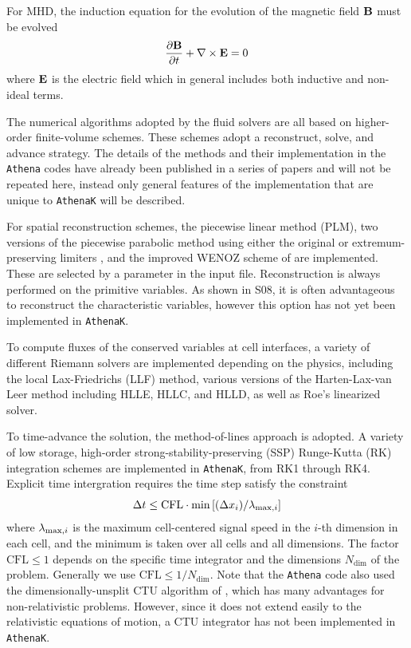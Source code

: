 \documentclass[twocolumn, floatfix]{aastex63}
\newcommand{\athena}{\texttt{Athena}}
\newcommand{\ak}{\texttt{AthenaK}}
\begin{document}
For MHD, the induction equation for the evolution of the magnetic field ${\bf B}$ must be evolved
\begin{equation}
\frac{\partial {\bf B}}{\partial t} + \nabla \times {\bf E} = 0
\label{eq:induction}
\end{equation}
where ${\bf E}$ is the electric field which in general includes both inductive and non-ideal terms.

The numerical algorithms adopted by the fluid solvers are all based on higher-order finite-volume schemes.  These schemes adopt a reconstruct, solve, and advance strategy. The details of the methods and their implementation in the \texttt{Athena} codes have already been published in a series of papers \citep{gs05, gs08, Stone+2008, Beckwith2011, WhiteStone2016, Stone2020ApJS..249....4S, 2023ApJ...949..103W} and will not be repeated here, instead only general features of the implementation that are unique to \ak{} will be described.

For spatial reconstruction schemes, the piecewise linear method (PLM), two versions of the piecewise parabolic method using either the original \citep[hereafter PPM4]{ColellaWoodward1984} or extremum-preserving limiters \citep[hereafter PPMX]{McCorquodale2015a}, and the improved WENOZ scheme of \cite{ACKER2016726} are implemented. These are selected by a parameter in the input file.  Reconstruction is always performed on the primitive variables.  As shown in S08, it is often advantageous to reconstruct the characteristic variables, however this option has not yet been implemented in \ak{}.

To compute fluxes of the conserved variables at cell interfaces, a variety of different Riemann solvers \citep{toro2013riemann} are implemented depending on the physics, including the local Lax-Friedrichs (LLF) method, various versions of the Harten-Lax-van Leer method including HLLE, HLLC, and HLLD, as well as Roe's linearized solver.

To time-advance the solution, the method-of-lines approach is adopted.
A variety of low storage, high-order strong-stability-preserving (SSP) Runge-Kutta (RK) integration
schemes \citep{Ketcheson2010} are implemented in \ak{}, from RK1 through RK4. Explicit time intergration requires the time step satisfy the constraint
\begin{equation}
    \Delta t \leq \mathrm{CFL} \cdot \min \left[ (\Delta x_i)/{\lambda}_{{\rm max},i} \right]
\end{equation}
where ${\lambda}_{{\rm max},i}$ is the maximum cell-centered signal speed in the $i$-th dimension in each cell, and the minimum is taken over all cells and all dimensions. The factor $\mathrm{CFL} \leq 1$ depends on the specific time integrator and the dimensions $N_\mathrm{dim}$ of the problem.  Generally we use $\mathrm{CFL} \leq 1 / N_\mathrm{dim}$.
Note that the \athena{} code also used the dimensionally-unsplit CTU algorithm of \cite{Colella1990}, which has many advantages for non-relativistic problems. However, since it does not extend easily to the relativistic equations of motion, a CTU integrator has not been implemented in \ak{}.
\end{document}

